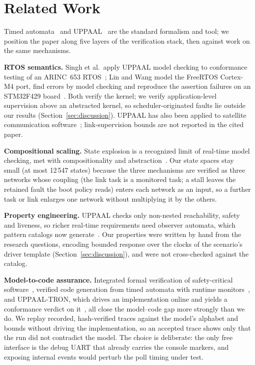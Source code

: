 \documentclass[conference,a4paper]{IEEEtran}
\begin{document}
\section{Related Work}
Timed automata~\cite{alur1994} and UPPAAL~\cite{larsen1997,behrmann2004} are the standard formalism and tool; we position the paper along five layers of the verification stack, then against work on the same mechanisms.

\textbf{RTOS semantics.} Singh et al.\ apply UPPAAL model checking to conformance testing of an ARINC~653 RTOS~\cite{singh2021}; Lin and Wang model the FreeRTOS Cortex-M4 port, find errors by model checking and reproduce the assertion failures on an STM32F429 board~\cite{lin2024}. Both verify the kernel; we verify application-level supervision above an abstracted kernel, so scheduler-originated faults lie outside our results (Section~\ref{sec:discussion}). UPPAAL has also been applied to satellite communication software~\cite{alencar2014}; link-supervision bounds are not reported in the cited paper.

\textbf{Compositional scaling.} State explosion is a recognized limit of real-time model checking, met with compositionality and abstraction~\cite{jensen2000}. Our state spaces stay small (at most 12\,547 states) because the three mechanisms are verified as three networks whose coupling (the link task is a monitored task; a stall leaves the retained fault the boot policy reads) enters each network as an input, so a further task or link enlarges one network without multiplying it by the others.

\textbf{Property engineering.} UPPAAL checks only non-nested reachability, safety and liveness, so richer real-time requirements need observer automata, which pattern catalogs now generate~\cite{vogel2023}. Our properties were written by hand from the research questions, encoding bounded response over the clocks of the scenario's driver template (Section~\ref{sec:discussion}), and were not cross-checked against the catalog.

\textbf{Model-to-code assurance.} Integrated formal verification of safety-critical software~\cite{ge2018}, verified code generation from timed automata with runtime monitors~\cite{cho2025}, and UPPAAL-TRON, which drives an implementation online and yields a conformance verdict on it~\cite{larsen2005}, all close the model--code gap more strongly than we do. We replay recorded, hash-verified traces against the model's alphabet and bounds without driving the implementation, so an accepted trace shows only that the run did not contradict the model. The choice is deliberate: the only free interface is the debug UART that already carries the console markers, and exposing internal events would perturb the poll timing under test.
\end{document}
